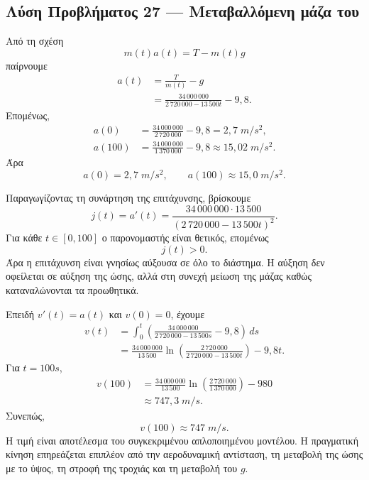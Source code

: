 \subsection*{Λύση Προβλήματος 27 --- Μεταβαλλόμενη μάζα του }

\begin{alist}
  \item Από τη σχέση
        \[
          m(t)a(t)=T-m(t)g
        \]
        παίρνουμε
        \begin{align*}
          a(t)
          &=\frac{T}{m(t)}-g\\
          &=\frac{34\,000\,000}
          {2\,720\,000-13\,500t}-9{,}8.
        \end{align*}
        Επομένως,
        \begin{align*}
          a(0)
          &=\frac{34\,000\,000}{2\,720\,000}-9{,}8
           =2{,}7\;\si{m/s^2},\\
          a(100)
          &=\frac{34\,000\,000}{1\,370\,000}-9{,}8
           \approx15{,}02\;\si{m/s^2}.
        \end{align*}
        Άρα
        \[
          {a(0)=2{,}7\;\si{m/s^2}},
          \qquad
          {a(100)\approx15{,}0\;\si{m/s^2}}.
        \]

  \item Παραγωγίζοντας τη συνάρτηση της επιτάχυνσης, βρίσκουμε
        \[
          j(t)=a'(t)
          =\frac{34\,000\,000\cdot13\,500}
          {(2\,720\,000-13\,500t)^2}.
        \]
        Για κάθε $t\in[0,100]$ ο παρονομαστής είναι θετικός, επομένως
        \[
          {j(t)>0}.
        \]
        Άρα η επιτάχυνση είναι γνησίως αύξουσα σε όλο το διάστημα. Η
        αύξηση δεν οφείλεται σε αύξηση της ώσης, αλλά στη συνεχή μείωση
        της μάζας καθώς καταναλώνονται τα προωθητικά.

  \item Επειδή $v'(t)=a(t)$ και $v(0)=0$, έχουμε
        \begin{align*}
          v(t)
          &=\int_0^t
          \left(
          \frac{34\,000\,000}{2\,720\,000-13\,500s}
          -9{,}8
          \right)\,ds\\
          &=\frac{34\,000\,000}{13\,500}
          \ln\left(
          \frac{2\,720\,000}{2\,720\,000-13\,500t}
          \right)-9{,}8t.
        \end{align*}
        Για $t=100\si{s}$,
        \begin{align*}
          v(100)
          &=\frac{34\,000\,000}{13\,500}
          \ln\left(\frac{2\,720\,000}{1\,370\,000}\right)-980\\
          &\approx747{,}3\;\si{m/s}.
        \end{align*}
        Συνεπώς,
        \[
          {v(100)\approx747\;\si{m/s}}.
        \]
        Η τιμή είναι αποτέλεσμα του συγκεκριμένου απλοποιημένου
        μοντέλου. Η πραγματική κίνηση επηρεάζεται επιπλέον από την
        αεροδυναμική αντίσταση, τη μεταβολή της ώσης με το ύψος, τη
        στροφή της τροχιάς και τη μεταβολή του $g$.
\end{alist}
